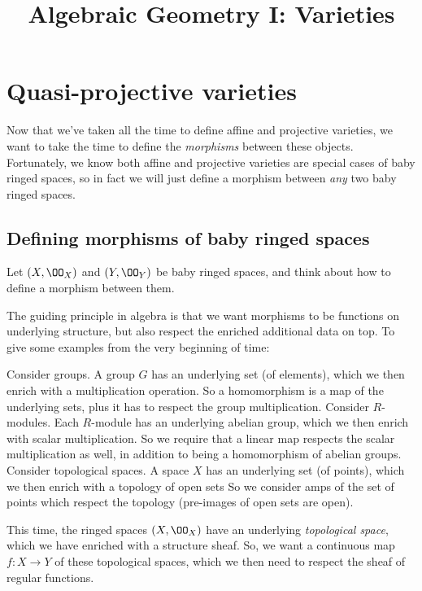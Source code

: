 \documentclass[11pt]{scrreprt}
\begin{document}
\title{Algebraic Geometry I: Varieties}
\maketitle

\tableofcontents

\chapter{Quasi-projective varieties}
Now that we've taken all the time to define affine and projective varieties,
we want to take the time to define the \emph{morphisms} between these objects.
Fortunately, we know both affine and projective varieties are special
cases of baby ringed spaces, so in fact we will just define a morphism
between \emph{any} two baby ringed spaces.

\section{Defining morphisms of baby ringed spaces}
Let $(X, \OO_X)$ and $(Y, \OO_Y)$ be baby ringed spaces, and think
about how to define a morphism between them.

The guiding principle in algebra is that we want morphisms
to be functions on underlying structure, but also respect
the enriched additional data on top.
To give some examples from the very beginning of time:
\begin{example}
	\listhack
	\begin{itemize}
	\ii Consider groups.
	A group $G$ has an underlying set (of elements),
	which we then enrich with a multiplication operation.
	So a homomorphism is a map of the underlying sets,
	plus it has to respect the group multiplication.
	\ii Consider $R$-modules.
	Each $R$-module has an underlying abelian group,
	which we then enrich with scalar multiplication.
	So we require that a linear map respects the scalar multiplication as well,
	in addition to being a homomorphism of abelian groups.
	\ii Consider topological spaces.
	A space $X$ has an underlying set (of points),
	which we then enrich with a topology of open sets
	So we consider amps of the set of points
	which respect the topology (pre-images of open sets are open).
	\end{itemize}
\end{example}
This time, the ringed spaces $(X, \OO_X)$ have an underlying
\emph{topological space}, which we have enriched with a structure sheaf.
So, we want a continuous map $f : X \to Y$ of these topological spaces,
which we then need to respect the sheaf of regular functions.
\end{document}
